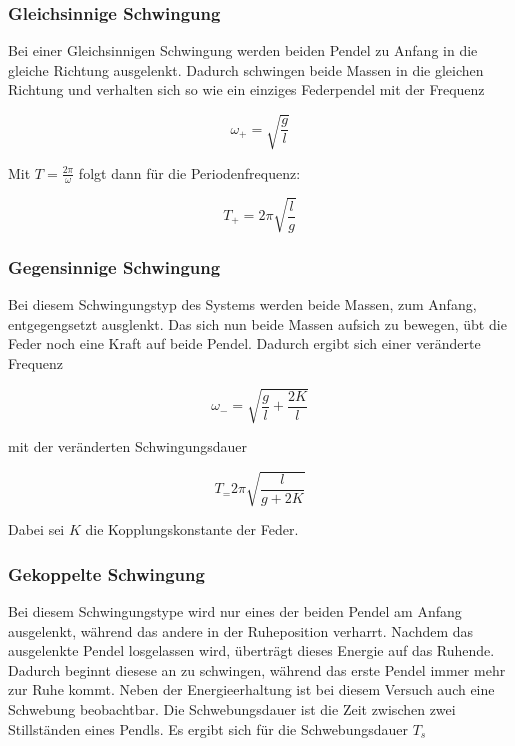 \subsubsection{Gleichsinnige Schwingung}

Bei einer Gleichsinnigen Schwingung werden beiden 
Pendel zu Anfang in die gleiche Richtung ausgelenkt.
Dadurch schwingen beide Massen in die gleichen Richtung und verhalten sich so wie ein einziges Federpendel mit der Frequenz

\begin{equation*}
\omega_+=\sqrt{\frac{g}{l}}
\end{equation*}

Mit $T=\frac{2\pi}{\omega}$ folgt dann für die Periodenfrequenz:

\begin{equation*}
T_+=2\pi\sqrt{\frac{l}{g}}
\end{equation*}

\subsubsection{Gegensinnige Schwingung}
Bei diesem Schwingungstyp des Systems werden beide Massen, zum Anfang, entgegengsetzt ausglenkt. Das sich nun beide Massen aufsich zu bewegen, übt die Feder noch eine Kraft auf beide Pendel.
Dadurch ergibt sich einer veränderte Frequenz

\begin{equation*}
\omega_-=\sqrt{\frac{g}{l}+\frac{2K}{l}}
\end{equation*}

mit der veränderten Schwingungsdauer

\begin{equation*}
T_=2\pi\sqrt{\frac{l}{g+2K}}
\end{equation*}

Dabei sei $K$ die Kopplungskonstante der Feder.

\subsubsection{Gekoppelte Schwingung}

Bei diesem Schwingungstype wird nur eines der beiden Pendel 
am Anfang ausgelenkt, während das andere in der Ruheposition 
verharrt. Nachdem das ausgelenkte Pendel losgelassen wird,
überträgt dieses Energie auf das Ruhende. Dadurch beginnt diesese an 
zu schwingen, während das erste Pendel immer mehr zur Ruhe kommt.
Neben der Energieerhaltung ist bei diesem Versuch auch eine Schwebung beobachtbar. Die Schwebungsdauer ist die Zeit zwischen
zwei Stillständen eines Pendls.
Es ergibt sich für die Schwebungsdauer $T_s$

